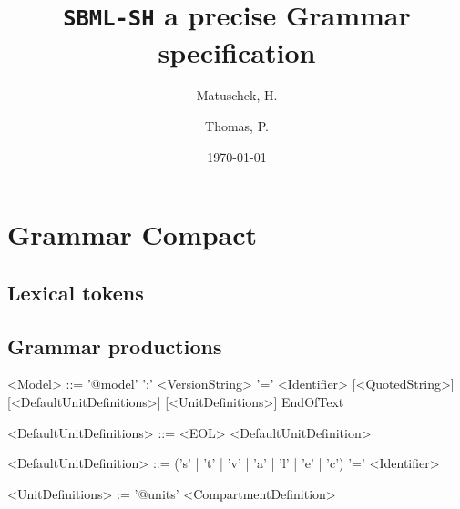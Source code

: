 \documentclass[a4paper]{article}
\title{\texttt{SBML-SH} a precise Grammar specification}
\author{Matuschek, H. \and Thomas, P.}
\date{\today}
\begin{document}
\maketitle

\section{Grammar Compact}
\subsection*{Lexical tokens}

\subsection*{Grammar productions}
\begin{grammar}
<Model> ::= '@model' ':' <VersionString> '=' <Identifier> [<QuotedString>] [<DefaultUnitDefinitions>] [<UnitDefinitions>] EndOfText

<DefaultUnitDefinitions> ::= <EOL> <DefaultUnitDefinition> 

<DefaultUnitDefinition> ::= ('s' | 't' | 'v' | 'a' | 'l' | 'e' | 'c') '=' <Identifier>
\end{grammar}

\begin{grammar}
<UnitDefinitions> := '@units'
  \alt <CompartmentDefinition>
\end{grammar}
\end{document}
